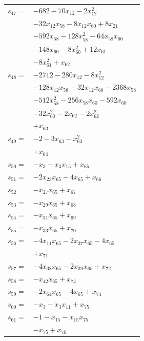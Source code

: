 \begin{longtable}{@{}r@{\;}l@{}}
\(s_{47}=\) & \(\displaystyle -682 -70x_{12} -2x_{12}^{2}\) \\
 & \(\displaystyle -32x_{12}x_{58} -8x_{12}x_{60} +8x_{21}\) \\
 & \(\displaystyle -592x_{58} -128x_{58}^{2} -64x_{58}x_{60}\) \\
 & \(\displaystyle -148x_{60} -8x_{60}^{2} +12x_{61}\) \\
 & \(\displaystyle -8x_{61}^{2} +x_{62}\) \\[3pt]
\(s_{48}=\) & \(\displaystyle -2712 -280x_{12} -8x_{12}^{2}\) \\
 & \(\displaystyle -128x_{12}x_{58} -32x_{12}x_{60} -2368x_{58}\) \\
 & \(\displaystyle -512x_{58}^{2} -256x_{58}x_{60} -592x_{60}\) \\
 & \(\displaystyle -32x_{60}^{2} -2x_{62} -2x_{62}^{2}\) \\
 & \(\displaystyle +x_{63}\) \\[3pt]
\(s_{49}=\) & \(\displaystyle -2 -3x_{63} -x_{63}^{2}\) \\
 & \(\displaystyle +x_{64}\) \\[3pt]
\(s_{50}=\) & \(\displaystyle -x_{3} -x_{3}x_{15} +x_{65}\) \\[3pt]
\(s_{51}=\) & \(\displaystyle -2x_{23}x_{65} -4x_{65} +x_{66}\) \\[3pt]
\(s_{52}=\) & \(\displaystyle -x_{27}x_{65} +x_{67}\) \\[3pt]
\(s_{53}=\) & \(\displaystyle -x_{29}x_{65} +x_{68}\) \\[3pt]
\(s_{54}=\) & \(\displaystyle -x_{31}x_{65} +x_{69}\) \\[3pt]
\(s_{55}=\) & \(\displaystyle -x_{33}x_{65} +x_{70}\) \\[3pt]
\(s_{56}=\) & \(\displaystyle -4x_{11}x_{65} -2x_{37}x_{65} -4x_{65}\) \\
 & \(\displaystyle +x_{71}\) \\[3pt]
\(s_{57}=\) & \(\displaystyle -4x_{38}x_{65} -2x_{39}x_{65} +x_{72}\) \\[3pt]
\(s_{58}=\) & \(\displaystyle -x_{42}x_{65} +x_{73}\) \\[3pt]
\(s_{59}=\) & \(\displaystyle -2x_{64}x_{65} -4x_{65} +x_{74}\) \\[3pt]
\(s_{60}=\) & \(\displaystyle -x_{3} -x_{3}x_{11} +x_{75}\) \\[3pt]
\(s_{61}=\) & \(\displaystyle -1 -x_{15} -x_{15}x_{75}\) \\
 & \(\displaystyle -x_{75} +x_{76}\) \\[3pt]

\end{longtable}
